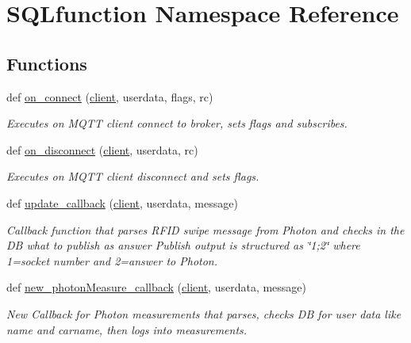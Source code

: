 \hypertarget{namespace_s_q_lfunction}{}\section{S\+Q\+Lfunction Namespace Reference}
\label{namespace_s_q_lfunction}
\subsection*{Functions}
\begin{DoxyCompactItemize}
\item 
def \hyperlink{namespace_s_q_lfunction_aa9ad8419206f0d4e4281775b4dcbf03d}{on\+\_\+connect} (\hyperlink{namespace_s_q_lfunction_ac9fb782d6f6dcc44fd19ea1b135ab996}{client}, userdata, flags, rc)
\begin{DoxyCompactList}\small\item\em Executes on M\+Q\+TT client connect to broker, sets flags and subscribes. \end{DoxyCompactList}\item 
def \hyperlink{namespace_s_q_lfunction_a3a3d48b63f188d8357c3422e417a58dc}{on\+\_\+disconnect} (\hyperlink{namespace_s_q_lfunction_ac9fb782d6f6dcc44fd19ea1b135ab996}{client}, userdata, rc)
\begin{DoxyCompactList}\small\item\em Executes on M\+Q\+TT client disconnect and sets flags. \end{DoxyCompactList}\item 
def \hyperlink{namespace_s_q_lfunction_ae16644514ae2cdbf375884361531f691}{update\+\_\+callback} (\hyperlink{namespace_s_q_lfunction_ac9fb782d6f6dcc44fd19ea1b135ab996}{client}, userdata, message)
\begin{DoxyCompactList}\small\item\em Callback function that parses R\+F\+ID swipe message from Photon and checks in the DB what to publish as answer Publish output is structured as \char`\"{}1;2\char`\"{} where 1=socket number and 2=answer to Photon. \end{DoxyCompactList}\item 
def \hyperlink{namespace_s_q_lfunction_a356dd5906768f7dd778408f466e9f9b4}{new\+\_\+photon\+Measure\+\_\+callback} (\hyperlink{namespace_s_q_lfunction_ac9fb782d6f6dcc44fd19ea1b135ab996}{client}, userdata, message)
\begin{DoxyCompactList}\small\item\em New Callback for Photon measurements that parses, checks DB for user data like name and carname, then logs into \textquotesingle{}measurements\textquotesingle{}. \end{DoxyCompactList}\item 

\end{DoxyCompactItemize}
